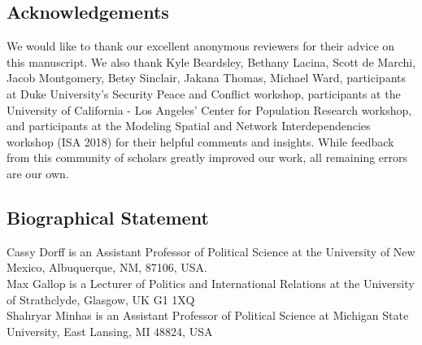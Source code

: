\documentclass[12pt,pdflatex,authoryear]{elsarticle}
\begin{document}
\newpage\setcounter{page}{1} 











\clearpage
\singlespacing

%
% 



\newpage

\subsection*{Acknowledgements}
\noindent We would like to thank our excellent anonymous reviewers for their advice on this manuscript. We also thank Kyle Beardsley, Bethany Lacina, Scott de Marchi, Jacob Montgomery, Betsy Sinclair, Jakana Thomas, Michael Ward, participants at Duke University's Security Peace and Conflict workshop, participants at the University of California - Los Angeles' Center for Population Research workshop, and participants at the Modeling Spatial and Network Interdependencies workshop (ISA 2018) for their helpful comments and insights. While feedback from this community of scholars greatly improved our work, all remaining errors are our own. 


\subsection*{Biographical Statement}
\noindent Cassy Dorff is an Assistant Professor of Political Science at the University of New Mexico, Albuquerque, NM, 87106, USA.\\
Max Gallop is a Lecturer of Politics and International Relations at the University of Strathclyde, Glasgow, UK G1 1XQ\\
Shahryar Minhas is an Assistant Professor of Political Science at Michigan State University, East Lansing, MI 48824, USA
\end{document}
